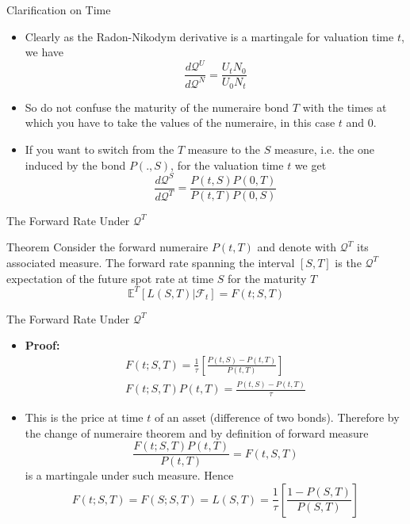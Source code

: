 \documentclass{beamer}
\begin{document}
\begin{frame}{Clarification on Time}
	\begin{itemize}
		\item Clearly as the Radon-Nikodym derivative is a martingale for valuation time $t$, we have
		\begin{equation}
			\frac{d\mathcal{Q}^U}{d\mathcal{Q}^N}=\frac{U_tN_0}{U_0N_t}
		\end{equation}
		\item So do not confuse the maturity of the numeraire bond $T$ with the times at which you have to take the values of the numeraire, in this case $t$ and 0.
		\item If you want to switch from the $T$ measure to the $S$ measure, i.e. the one induced by the bond $P(.,S)$, for the valuation time $t$ we get
		\begin{equation}
			\frac{d\mathcal{Q}^S}{d\mathcal{Q}^T}=\frac{P(t,S)P(0,T)}{P(t,T)P(0,S)}
		\end{equation}
	\end{itemize}
\end{frame}

\begin{frame}{The Forward Rate Under $\mathcal{Q}^T$}
	\begin{block}{Theorem}
		Consider the forward numeraire $P(t,T)$ and denote with $\mathcal{Q}^T$ its associated measure.
		The forward rate spanning the interval $[S,T]$ is the $\mathcal{Q}^T$ expectation of the future spot rate at time $S$ for the maturity $T$
		\begin{equation}
			\mathbb{E}^T[L(S,T)|\mathcal{F}_t] = F(t;S,T)
		\end{equation}
	\end{block}
\end{frame}

\begin{frame}{The Forward Rate Under $\mathcal{Q}^T$}
	\begin{itemize}
	\item \textbf{Proof:}
		\begin{equation*}
			\begin{gathered}
				F(t;S,T) = \frac{1}{\tau}\left[\frac{P(t,S)-P(t,T)}{P(t,T)}\right] \\[0.3cm]
				F(t;S,T)P(t,T) = \frac{P(t,S)-P(t,T)}{\tau}
			\end{gathered}
		\end{equation*}
	\item This is the price at time $t$ of an asset (difference of two bonds). Therefore by the change of numeraire theorem and by definition of forward measure
		\begin{equation*}
			\frac{F(t;S,T)P(t,T)}{P(t,T)} = F(t,S,T)
		\end{equation*}
		is a martingale under such measure. Hence
		\begin{equation*}
			F(t;S,T) = F(S;S,T) = L(S,T) = \frac{1}{\tau}\left[\frac{1-P(S,T)}{P(S,T)}\right]
		\end{equation*}
	\end{itemize}
\end{frame}
\end{document}
